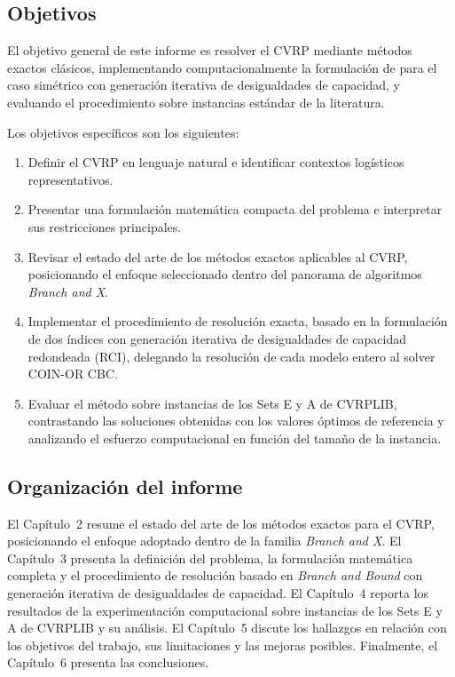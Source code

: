 \subsection{Objetivos}

El objetivo general de este informe es resolver el CVRP mediante métodos exactos
clásicos, implementando computacionalmente la formulación de
\textcite{laporte1983branch} para el caso simétrico con generación iterativa de
desigualdades de capacidad, y evaluando el procedimiento sobre instancias
estándar de la literatura.

Los objetivos específicos son los siguientes:
\begin{enumerate}
    \item Definir el CVRP en lenguaje natural e identificar contextos logísticos
          representativos.
    \item Presentar una formulación matemática compacta del problema e interpretar sus
          restricciones principales.
    \item Revisar el estado del arte de los métodos exactos aplicables al CVRP,
          posicionando el enfoque seleccionado dentro del panorama de algoritmos
          \textit{Branch and X}.
    \item Implementar el procedimiento de resolución exacta, basado en la
          formulación de dos índices con generación iterativa de desigualdades de
          capacidad redondeada (RCI), delegando la resolución de cada modelo entero
          al solver COIN-OR CBC.
    \item Evaluar el método sobre instancias de los Sets E y A de CVRPLIB, contrastando las
          soluciones obtenidas con los valores óptimos de referencia y analizando el
          esfuerzo computacional en función del tamaño de la instancia.
\end{enumerate}

\subsection{Organización del informe}

El Capítulo~2 resume el estado del arte de los métodos exactos para el CVRP,
posicionando el enfoque adoptado dentro de la familia \textit{Branch and X}. El
Capítulo~3 presenta la definición del problema, la formulación matemática completa y
el procedimiento de resolución basado en \textit{Branch and Bound} con generación
iterativa de desigualdades de capacidad. El Capítulo~4 reporta los resultados de la experimentación computacional sobre
instancias de los Sets E y A de CVRPLIB y su análisis. El Capítulo~5 discute
los hallazgos en relación con los objetivos del trabajo, sus limitaciones y las
mejoras posibles. Finalmente, el Capítulo~6 presenta las conclusiones.